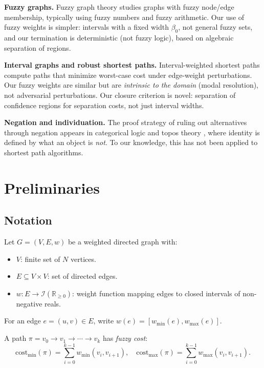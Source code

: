 \documentclass[twocolumn,11pt,a4paper]{article}
\theoremstyle{definition}
\begin{document}
\textbf{Fuzzy graphs.} Fuzzy graph theory \cite{rosenfeld1975,bhattacharya2001,binu2012} studies graphs with fuzzy node/edge membership, typically using fuzzy numbers and fuzzy arithmetic. Our use of fuzzy weights is simpler: intervals with a fixed width $\beta_0$, not general fuzzy sets, and our termination is deterministic (not fuzzy logic), based on algebraic separation of regions.

\textbf{Interval graphs and robust shortest paths.} Interval-weighted shortest paths \cite{montemanni2004,schöbel2005} compute paths that minimize worst-case cost under edge-weight perturbations. Our fuzzy weights are similar but are \emph{intrinsic to the domain} (modal resolution), not adversarial perturbations. Our closure criterion is novel: separation of confidence regions for separation costs, not just interval widths.

\textbf{Negation and individuation.} The proof strategy of ruling out alternatives through negation appears in categorical logic \cite{lawvere1966} and topos theory \cite{johnstone2002}, where identity is defined by what an object is \emph{not}. To our knowledge, this has not been applied to shortest path algorithms.

\section{Preliminaries}

\subsection{Notation}

Let $G = (V, E, w)$ be a weighted directed graph with:
\begin{itemize}
\item $V$: finite set of $N$ vertices.
\item $E \subseteq V \times V$: set of directed edges.
\item $w: E \to \mathcal{I}(\mathbb{R}_{\geq 0})$: weight function mapping edges to closed intervals of non-negative reals.
\end{itemize}

For an edge $e = (u,v) \in E$, write $w(e) = [w_{\min}(e), w_{\max}(e)]$.

A path $\pi = v_0 \to v_1 \to \cdots \to v_k$ has \emph{fuzzy cost}:
\begin{equation}
\text{cost}_{\min}(\pi) = \sum_{i=0}^{k-1} w_{\min}(v_i, v_{i+1}), \quad
\text{cost}_{\max}(\pi) = \sum_{i=0}^{k-1} w_{\max}(v_i, v_{i+1}).
\end{equation}
\end{document}
